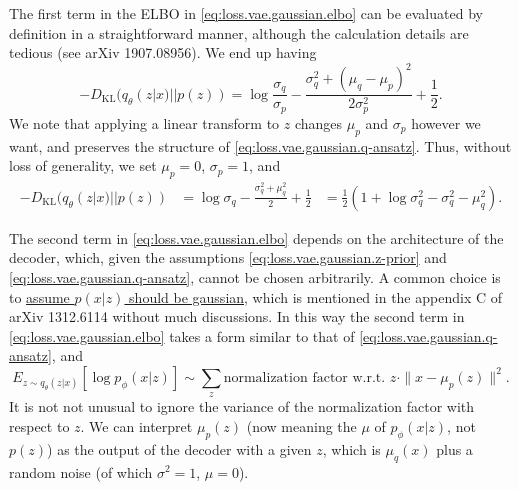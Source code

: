 \documentclass[hyperref, a4paper, 12pt]{report}
\def\\{}%
\def\mathbb#1{#1}%
\begin{document}
The first term in the ELBO in \eqref{eq:loss.vae.gaussian.elbo} can be evaluated by definition
in a straightforward manner, although the calculation details are tedious (see arXiv 1907.08956).
We end up having
\begin{equation}
    - D_{\text{KL}}(q_\theta(z|x) || p(z)) = \log \frac{\sigma_q}{\sigma_p} - \frac{\sigma_q^2 + (\mu_q - \mu_p)^2}{2 \sigma_p^2} + \frac{1}{2}.
\end{equation}
We note that applying a linear transform to $z$ changes $\mu_p$ and $\sigma_p$ however we want,
and preserves the structure of \eqref{eq:loss.vae.gaussian.q-ansatz}.
Thus, without loss of generality, we set $\mu_p = 0$, $\sigma_p = 1$,
and 
\begin{equation}
    \begin{aligned}
        - D_{\text{KL}}(q_\theta(z|x) || p(z)) &= \log \sigma_q - \frac{\sigma_q^2 + \mu_q^2}{2} + \frac{1}{2} \\
        &= \frac{1}{2} \left(
            1 + \log \sigma_q^2 - \sigma_q^2 - \mu_q^2
        \right).
    \end{aligned}
\end{equation}

The second term in \eqref{eq:loss.vae.gaussian.elbo} depends on the architecture of the decoder,
which, given the assumptions \eqref{eq:loss.vae.gaussian.z-prior} and \eqref{eq:loss.vae.gaussian.q-ansatz},
cannot be chosen arbitrarily.
A common choice is to \uline{assume $p(x|z)$ should be gaussian}, which is mentioned in the appendix C of arXiv 1312.6114 without much discussions.
In this way the second term in \eqref{eq:loss.vae.gaussian.elbo} takes a form similar to that of \eqref{eq:loss.vae.gaussian.q-ansatz},
and 
\begin{equation}
    \mathbb{E}_{z \sim q_\theta(z|x)} [\log p_\phi (x|z)] \sim \sum_z
    \text{normalization factor w.r.t. $z$} \cdot \|x - \mu_p(z)\|^2.
\end{equation}
It is not not unusual to ignore the variance of the normalization factor with respect to $z$.
We can interpret $\mu_p(z)$ (now meaning the $\mu$ of $p_\phi(x|z)$, not $p(z)$) as the output of the decoder with a given $z$,
which is $\mu_q(x)$ plus a random noise (of which $\sigma^2 = 1$, $\mu = 0$).
\end{document}
